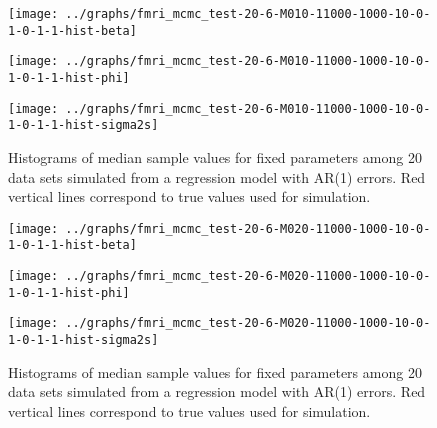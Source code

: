 \documentclass{article}
\begin{document}
\begin{figure}[ht]
\begin{minipage}{0.5\linewidth}
\texttt{[image: ../graphs/fmri\_mcmc\_test-20-6-M010-11000-1000-10-0-1-0-1-1-hist-beta]}
\end{minipage}
\begin{minipage}{0.5\linewidth}
\texttt{[image: ../graphs/fmri\_mcmc\_test-20-6-M010-11000-1000-10-0-1-0-1-1-hist-phi]}
\end{minipage}
\begin{minipage}{0.5\linewidth}
\texttt{[image: ../graphs/fmri\_mcmc\_test-20-6-M010-11000-1000-10-0-1-0-1-1-hist-sigma2s]}
\end{minipage}
\caption{Histograms of median sample values for fixed parameters among 20 data sets simulated from a regression model with AR(1) errors. Red vertical lines correspond to true values used for simulation.} \label{fig:medtheta1}
\end{figure}

\begin{figure}[ht]
\begin{minipage}{0.5\linewidth}
\texttt{[image: ../graphs/fmri\_mcmc\_test-20-6-M020-11000-1000-10-0-1-0-1-1-hist-beta]}
\end{minipage}
\begin{minipage}{0.5\linewidth}
\texttt{[image: ../graphs/fmri\_mcmc\_test-20-6-M020-11000-1000-10-0-1-0-1-1-hist-phi]}
\end{minipage}
\begin{minipage}{0.5\linewidth}
\texttt{[image: ../graphs/fmri\_mcmc\_test-20-6-M020-11000-1000-10-0-1-0-1-1-hist-sigma2s]}
\end{minipage}
\caption{Histograms of median sample values for fixed parameters among 20 data sets simulated from a regression model with AR(1) errors. Red vertical lines correspond to true values used for simulation.} \label{fig:medtheta2}
\end{figure}
\end{document}
